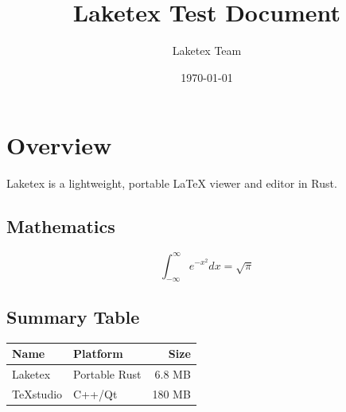 \documentclass{article}
\title{Laketex Test Document}
\author{Laketex Team}
\date{\today}
\begin{document}
\maketitle

\section{Overview}
Laketex is a lightweight, portable LaTeX viewer and editor in Rust.

\subsection{Mathematics}
\begin{equation}
\int_{-\infty}^{\infty} e^{-x^2} dx = \sqrt{\pi}
\end{equation}

\subsection{Summary Table}
\begin{table}[htbp]
\centering
\begin{tabular}{llr}
\toprule
Name & Platform & Size \\
\midrule
Laketex & Portable Rust & 6.8 MB \\
TeXstudio & C++/Qt & 180 MB \\
\bottomrule
\end{tabular}
\end{table}
\end{document}
